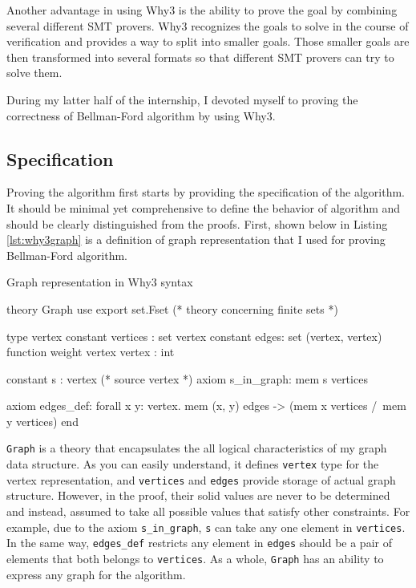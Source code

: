 \documentclass[a4paper,12pt]{article}
\begin{document}
Another advantage in using Why3 is the ability to prove the goal by
combining several different SMT provers. Why3 recognizes the goals to
solve in the course of verification and provides a way to split into
smaller goals. Those smaller goals are then transformed into several
formats so that different SMT provers can try to solve them.

During my latter half of the internship, I devoted myself to proving
the correctness of Bellman-Ford algorithm by using Why3.

\subsection{Specification}

Proving the algorithm first starts by providing the specification of
the algorithm. It should be minimal yet comprehensive to define the
behavior of algorithm and should be clearly distinguished from the
proofs. First, shown below in Listing \ref{lst:why3graph} is a
definition of graph representation that I used for proving
Bellman-Ford algorithm.

\setcounter{algorithm}{4}
\begin{algorithm}
\caption{Graph representation in Why3 syntax}\label{lst:why3graph}
\begin{why3}
theory Graph
  use export set.Fset (* theory concerning finite sets *)

  type vertex
  constant vertices : set vertex
  constant edges: set (vertex, vertex)
  function weight vertex vertex : int

  constant s : vertex (* source vertex *)
  axiom s_in_graph: mem s vertices

  axiom edges_def:
    forall x y: vertex. mem (x, y) edges ->
    (mem x vertices /\ mem y vertices)
end
\end{why3}
\end{algorithm}

\texttt{Graph} is a theory that encapsulates the all logical
characteristics of my graph data structure. As you can easily
understand, it defines \texttt{vertex} type for the vertex
representation, and \texttt{vertices} and \texttt{edges} provide
storage of actual graph structure. However, in the proof, their solid
values are never to be determined and instead, assumed to take all
possible values that satisfy other constraints. For example, due to
the axiom \texttt{s\_in\_graph}, \texttt{s} can take any one element
in \texttt{vertices}. In the same way, \texttt{edges\_def} restricts
any element in \texttt{edges} should be a pair of elements that both
belongs to \texttt{vertices}. As a whole, \texttt{Graph} has an
ability to express any graph for the algorithm.
\end{document}
